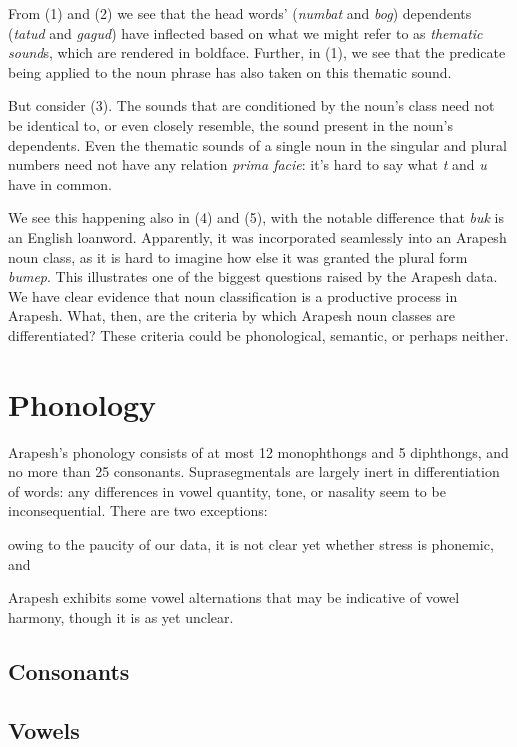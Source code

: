 \documentclass[pdftex,12pt,a4paper]{article}
\begin{document}
\noindent From (1) and (2) we see that the head words' (\emph{numbat} and \emph{bog}) dependents (\emph{tatud} and \emph{gagud}) have inflected based on what we might refer to as \emph{thematic sound}s, which are rendered in boldface. Further, in (1), we see that the predicate being applied to the noun phrase has also taken on this thematic sound.

But consider (3). The sounds that are conditioned by the noun's class need not be identical to, or even closely resemble, the sound present in the noun's dependents. Even the thematic sounds of a single noun in the singular and plural numbers need not have any relation \emph{prima facie}: it's hard to say what \emph{t} and \emph{u} have in common.

We see this happening also in (4) and (5), with the notable difference that \emph{buk} is an English loanword. Apparently, it was incorporated seamlessly into an Arapesh noun class, as it is hard to imagine how else it was granted the plural form \emph{bumep}. This illustrates one of the biggest questions raised by the Arapesh data. We have clear evidence that noun classification is a productive process in Arapesh. What, then, are the criteria by which Arapesh noun classes are differentiated? These criteria could be phonological, semantic, or perhaps neither.

\section{Phonology}

Arapesh's phonology consists of at most 12 monophthongs and 5 diphthongs, and no more than 25 consonants. Suprasegmentals are largely inert in differentiation of words: any differences in vowel quantity, tone, or nasality seem to be inconsequential. There are two exceptions: \begin{inparaenum}[(a)] \item owing to the paucity of our data, it is not clear yet whether stress is phonemic, and \item Arapesh exhibits some vowel alternations that may be indicative of vowel harmony, though it is as yet unclear. \end{inparaenum} 

\subsection{Consonants}

\subsection{Vowels}
\end{document}
